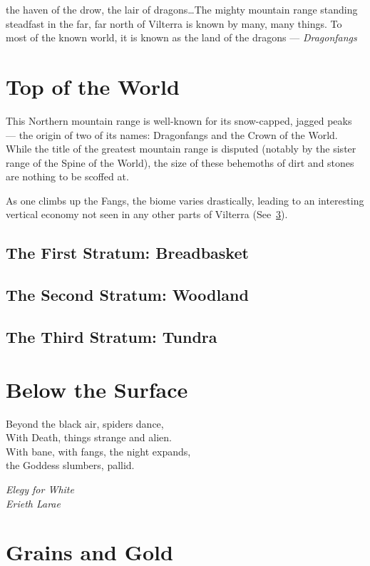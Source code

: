 \documentclass[../main.tex]{subfiles}
\begin{document}
 the haven of the drow,
the lair of dragons\ldots The mighty mountain range standing steadfast in the far,
far north of Vilterra is known by many, many things. To
most of the known world, it is known as the land of the
dragons --- \emph{Dragonfangs}

\section{Top of the World}
This Northern mountain range is well-known for its snow-capped, jagged peaks ---
the origin of two of its names: Dragonfangs and the Crown of the World.
While the title of the greatest mountain range is disputed (notably by the
sister range of the Spine of the World), the size of these behemoths of
dirt and stones are nothing to be scoffed at.

As one climbs up the Fangs, the biome varies drastically, leading to an interesting
vertical economy not seen in any other parts of Vilterra
(See~\ref{sec:grainsandgold}).

\subsection{The First Stratum: Breadbasket} %

\subsection{The Second Stratum: Woodland}

\subsection{The Third Stratum: Tundra}

\section{Below the Surface}
\epigraph{Beyond the black air, spiders dance,\\
With Death, things strange and alien.\\
With bane, with fangs, the night expands,\\
the Goddess slumbers, pallid.}
{\emph{Elegy for White\\Erieth Larae}}

\section{Grains and Gold}\label{sec:grainsandgold}
\end{document}
